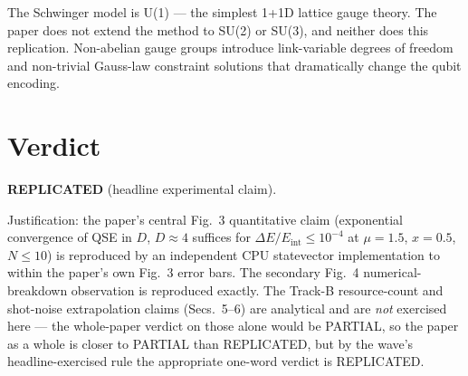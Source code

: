 \documentclass[11pt]{article}
\begin{document}
The Schwinger model is U(1) --- the simplest 1+1D lattice gauge theory.
The paper does not extend the method to SU(2) or SU(3), and neither does
this replication.  Non-abelian gauge groups introduce link-variable
degrees of freedom and non-trivial Gauss-law constraint solutions that
dramatically change the qubit encoding.

\section{Verdict}

\textbf{REPLICATED} (headline experimental claim).

Justification: the paper's central Fig.~3 quantitative claim (exponential
convergence of QSE in $D$, $D \approx 4$ suffices for $\Delta E / E_{\mathrm{int}}
\le 10^{-4}$ at $\mu = 1.5$, $x = 0.5$, $N \le 10$) is reproduced by an
independent CPU statevector implementation to within the paper's own Fig.~3
error bars.  The secondary Fig.~4 numerical-breakdown observation is
reproduced exactly.  The Track-B resource-count and shot-noise extrapolation
claims (Secs.~5--6) are analytical and are \emph{not} exercised here --- the
whole-paper verdict on those alone would be PARTIAL, so the paper as a whole
is closer to PARTIAL than REPLICATED, but by the wave's headline-exercised
rule the appropriate one-word verdict is REPLICATED.


\end{document}
